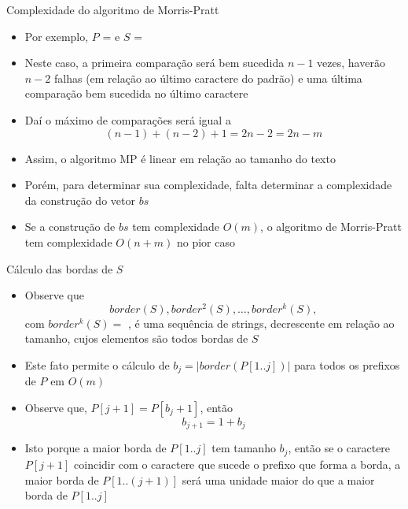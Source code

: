 \begin{frame}[fragile]{Complexidade do algoritmo de Morris-Pratt}

    \begin{itemize}
        \item Por exemplo, $P$ =  e $S$ = 

        \item Neste caso, a primeira comparação será bem sucedida $n - 1$ vezes, haverão $n - 2$
        falhas (em relação ao último caractere do padrão) e uma última comparação bem sucedida no 
        último caractere

        \item Daí o máximo de comparações será igual a 
        \[
            (n - 1) + (n - 2) + 1 = 2n - 2 = 2n - m
        \]

        \item Assim, o algoritmo MP é linear em relação ao tamanho do texto

        \item Porém, para determinar sua complexidade, falta determinar a complexidade da 
            construção do vetor $bs$

        \item Se a construção de $bs$ tem complexidade $O(m)$, o algoritmo de Morris-Pratt tem
            complexidade $O(n + m)$ no pior caso
    \end{itemize}

\end{frame}

\begin{frame}[fragile]{Cálculo das bordas de $S$}

    \begin{itemize}
        \item Observe que
        \[
            border(S), border^2(S), \ldots, border^k(S),
        \]
        com $border^k(S) = $ , é uma sequência de strings, decrescente em relação
        ao tamanho, cujos elementos são todos bordas de $S$

        \item Este fato permite o cálculo de $b_j = |border(P[1..j])|$ para todos os prefixos de 
            $P$ em $O(m)$

        \item Observe que, $P[j + 1] = P[b_j + 1]$, então 
        \[
            b_{j + 1} = 1 + b_j
        \]

        \item Isto porque a maior borda de $P[1..j]$ tem tamanho $b_j$, então se o caractere
            $P[j + 1]$ coincidir com o caractere que sucede o prefixo que forma a borda, 
            a maior borda de $P[1..(j+1)]$  será uma unidade maior do que a maior borda de $P[1..j]$
    \end{itemize}

\end{frame}

